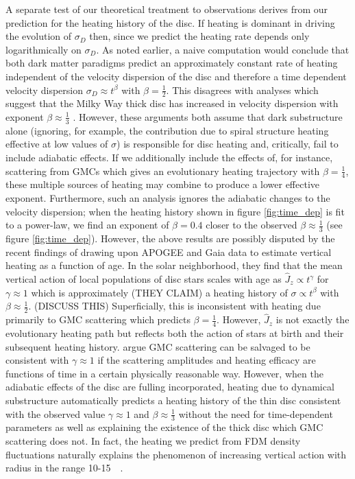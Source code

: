 \documentclass[usenatbib]{mnras}
\begin{document}
{\color{magenta} A separate test of our theoretical treatment to observations derives from our prediction for the heating history of the disc. If heating is dominant in driving the evolution of $\sigma_D$ then, since we predict the heating rate depends only logarithmically on $\sigma_D$. As noted earlier, a naive computation would conclude that both dark matter paradigms predict an approximately constant rate of heating independent of the velocity dispersion of the disc and therefore a time dependent velocity dispersion $\sigma_D \approx t^{\beta}$ with $\beta = \tfrac{1}{2}$. This disagrees with analyses which suggest that the Milky Way thick disc has increased in velocity dispersion with exponent $\beta \approx \tfrac{1}{3}$ \citep{heating_history}. However, these arguments both assume that dark substructure alone (ignoring, for example, the contribution due to spiral structure heating effective at low values of $\sigma$) is responsible for disc heating and, critically, fail to include adiabatic effects.} {\color{red} If we additionally include the effects of, for instance, scattering from GMCs which gives an evolutionary heating trajectory with $\beta = \frac{1}{4}$, these multiple sources of heating may combine to produce a lower effective exponent. } Furthermore, such an analysis ignores the adiabatic changes to the velocity dispersion; when the heating history shown in figure \ref{fig:time_dep} is fit to a power-law, we find an exponent of $\beta = 0.4$ closer to the observed $\beta \approx \frac{1}{3}$ (see figure \ref{fig:time_dep}). However, the above results are possibly disputed by the recent findings of \cite{Gaia_vertical_motions} drawing upon APOGEE and Gaia data to estimate vertical heating as a function of age. In the solar neighborhood, they find that the {\color{red} mean vertical action of local populations of disc stars} scales with age as $\widehat{J}_z \propto t^{\gamma}$ for $\gamma \approx 1$ which is approximately (THEY CLAIM) a heating history of $\sigma \propto t^\beta$ with $\beta \approx \frac{1}{2}$. (DISCUSS THIS) Superficially, this is inconsistent with heating due primarily to GMC scattering which predicts $\beta = \frac{1}{4}$. However, $\widehat{J}_z$ is not exactly the evolutionary heating path but reflects both the action of {\color{red} stars} at birth and their subsequent heating history. \cite{Gaia_vertical_motions} argue GMC scattering can be salvaged to be consistent with $\gamma \approx 1$ if the scattering amplitudes and heating efficacy are functions of time in a certain physically reasonable way. {\color{magenta} However, when the adiabatic effects of the disc are fulling incorporated, heating due to dynamical substructure automatically predicts a heating history of the thin disc consistent with the observed value $\gamma \approx 1$ and $\beta \approx \frac{1}{3}$ without the need for time-dependent parameters as well as explaining the existence of the thick disc which GMC scattering does not. In fact, the heating we predict from FDM {\color{magenta} density fluctuations} naturally explains the phenomenon of increasing vertical action with radius in the range 10-\SI{15}{\kilo \parsec}. }
\end{document}
